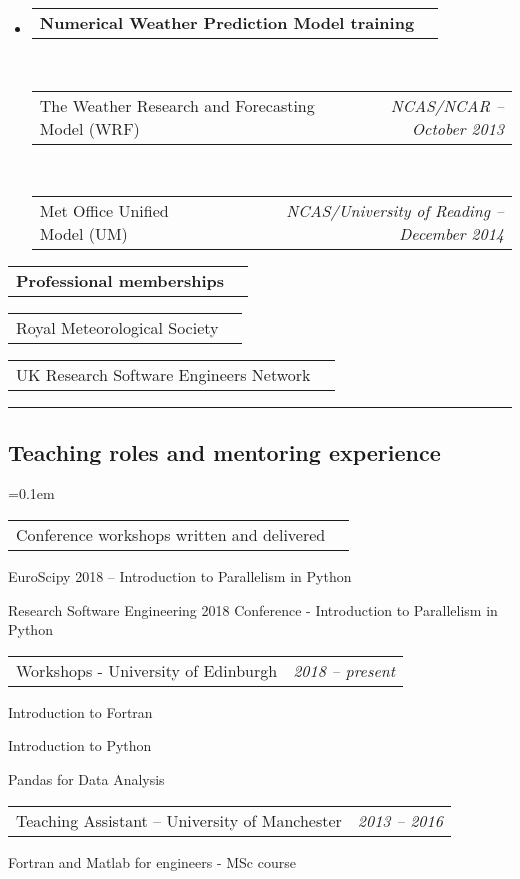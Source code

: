 \documentclass[10.5pt,a4]{article}
\makeatletter
\newcommand{\headerrow}[2]
{\begin{tabular*}{\linewidth}{l@{\extracolsep{\fill}}r}
	#1 &
	#2 \\
\end{tabular*}}
\makeatother
\begin{document}
\begin{itemize}
	\item 
	\headerrow
		{\textbf{Numerical Weather Prediction Model training}}
		{}
	\\
		\headerrow
		{The Weather Research and Forecasting Model (WRF)} 
		{\textit{NCAS/NCAR -- October 2013}}
  \\
		\headerrow
		{Met Office Unified Model (UM)}
		{\textit{NCAS/University of Reading -- December 2014}}
\end{itemize}

%

\begin{itemize*}
	\item 
	\headerrow
		{\textbf{Professional memberships}}
		{}
	\headerrow {Royal Meteorological Society}{}
	\headerrow {UK Research Software Engineers Network}{}

\end{itemize*}

\hrule
\vspace{-0.4em}
\subsection*{Teaching roles and mentoring experience} 
	\parskip=0.1em
\begin{itemize*}
	\item
	\headerrow
	{Conference workshops written and delivered}
	{}
	  \begin{itemize*}
	  \item EuroScipy 2018 -- Introduction to Parallelism in Python
	  \item Research Software Engineering 2018 Conference - Introduction to Parallelism in Python
	  \end{itemize*}

	\item
	\headerrow
	{Workshops - University of Edinburgh}
	{\textit{2018 -- present}}
	  \begin{itemize*}
	  \item Introduction to Fortran
	  \item Introduction to Python
	  \item Pandas for Data Analysis
	  \end{itemize*}


	\item
	\headerrow
	{Teaching Assistant -- University of Manchester}
	{\textit{2013 -- 2016}}
	  \begin{itemize*}
	  \item Fortran and Matlab for engineers - MSc course
	  \end{itemize*}
\end{itemize*}
\end{document}
